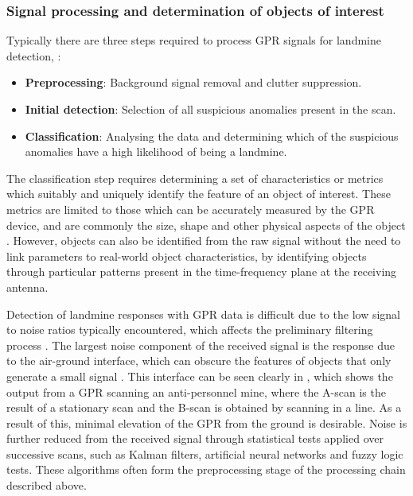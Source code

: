 \documentclass[main.tex]{subfiles}
\begin{document}
\subsubsection{Signal processing and determination of objects of interest}
Typically there are three steps required to process GPR signals for landmine detection, \parencite{Ho.etal2004}:
\begin{itemize}
\item \textbf{Preprocessing}: Background signal removal and clutter suppression.
\item \textbf{Initial detection}: Selection of all suspicious anomalies present in the scan.
\item \textbf{Classification}: Analysing the data and determining which of the suspicious anomalies have a high likelihood of being a landmine.
\end{itemize}
The classification step requires determining a set of characteristics or metrics which suitably and uniquely identify the feature of an object of interest. These metrics are limited to those which can be accurately measured by the GPR device, and are commonly the size, shape and other physical aspects of the object \parencite{Ho2008}. However, objects can also be identified from the raw signal without the need to link parameters to real-world object characteristics, by identifying objects through particular patterns present in the time-frequency plane at the receiving antenna. 

Detection of landmine responses with GPR data is difficult due to the low signal to noise ratios typically encountered, which affects the preliminary filtering process \parencite{shresta2003}. The largest noise component of the received signal is the response due to the air-ground interface, which can obscure the features of objects that only generate a small signal \parencite{Yarovoy2009}. This interface can be seen clearly in , which shows the output from a GPR scanning an anti-personnel mine, where the A-scan is the result of a stationary scan and the B-scan is obtained by scanning in a line. As a result of this, minimal elevation of the GPR from the ground is desirable. Noise is further reduced from the received signal through statistical tests applied over successive scans, such as Kalman filters, artificial neural networks and fuzzy logic tests. These algorithms often form the preprocessing stage of the processing chain described above.
\end{document}
